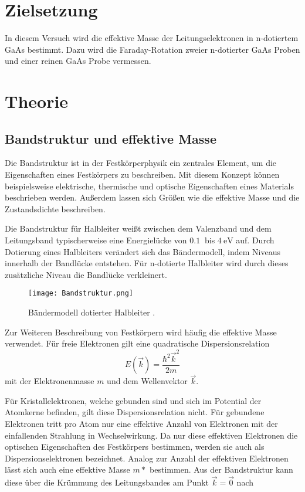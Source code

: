\section{Zielsetzung}
In diesem Versuch wird die effektive Masse der Leitungselektronen in n-dotiertem GaAs bestimmt.
Dazu wird die Faraday-Rotation zweier n-dotierter GaAs Proben und einer reinen GaAs Probe vermessen.

\section{Theorie}
\subsection{Bandstruktur und effektive Masse}

Die Bandstruktur ist in der Festkörperphysik ein zentrales Element, um die Eigenschaften
eines Festkörpers zu beschreiben. Mit diesem Konzept können beispielsweise elektrische, thermische
und optische Eigenschaften eines Materials beschrieben werden. Außerdem lassen sich Größen wie die
effektive Masse und die Zustandsdichte beschreiben.

Die Bandstruktur für Halbleiter weißt zwischen dem Valenzband und dem Leitungsband typischerweise
eine Energielücke von $\SI{0,1}{}$ bis $\SI{4}{\eV}$ auf. Durch Dotierung eines Halbleiters
verändert sich das Bändermodell, indem Niveaus innerhalb der Bandlücke entstehen.
Für n-dotierte Halbleiter wird durch dieses zusätzliche Niveau die Bandlücke verkleinert.

\begin{figure}[H]
  \centering
  \texttt{[image: Bandstruktur.png]}
  \caption{Bändermodell dotierter Halbleiter \cite{halbleiter}.}
  \label{fig:Band}
\end{figure}

Zur Weiteren Beschreibung von Festkörpern wird häufig die effektive Masse verwendet.
Für freie Elektronen gilt eine quadratische Dispersionsrelation
\begin{equation}
  E(\vec{k})=\frac{\hbar^2 \vec{k}^2}{2m}
\end{equation}
mit der Elektronenmasse $m$ und dem Wellenvektor $\vec{k}$.

Für Kristallelektronen, welche gebunden sind und sich im Potential der
Atomkerne befinden, gilt diese Dispersionsrelation nicht. Für gebundene
Elektronen tritt pro Atom nur eine effektive Anzahl von Elektronen mit der einfallenden
Strahlung in Wechselwirkung. Da nur diese effektiven Elektronen die optischen
Eigenschaften des Festkörpers bestimmen, werden sie auch als Dispersionselektronen
bezeichnet. Analog zur Anzahl der effektiven Elektronen lässt sich auch eine
effektive Masse $m*$ bestimmen. Aus der Bandstruktur kann diese über die Krümmung des
Leitungsbandes am Punkt $\vec{k}=\vec{0}$ nach

